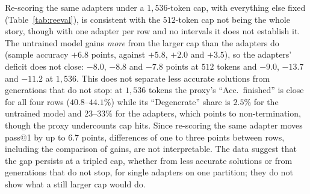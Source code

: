 \documentclass[runningheads]{llncs}
\begin{document}
Re-scoring the same adapters under a $1{,}536$-token cap, with everything else
fixed (Table~\ref{tab:reeval}), is consistent with the $512$-token cap not being
the whole story, though with one adapter per row and no intervals it does not
establish it. The untrained model gains \emph{more} from the larger cap than the adapters
do (sample accuracy $+6.8$ points, against $+5.8$, $+2.0$ and $+3.5$), so the
adapters' deficit does not close: $-8.0$, $-8.8$ and $-7.8$ points at $512$ tokens
and $-9.0$, $-13.7$ and $-11.2$ at $1{,}536$. This does not separate less
accurate solutions from generations that do not stop: at $1{,}536$ tokens the
proxy's ``Acc.\ finished'' is close for all four rows ($40.8$--$44.1\%$) while its
``Degenerate'' share is $2.5\%$ for the untrained model and $23$--$33\%$ for the
adapters, which points to non-termination, though the proxy undercounts cap
hits. Since re-scoring the same adapter moves pass@1 by up to $6.7$ points,
differences of one to three points between rows, including the comparison of
gains, are not interpretable. The data suggest that the gap persists at a
tripled cap, whether from less accurate solutions or from generations that do
not stop, for single adapters on one partition; they do not show what a still
larger cap would do.
\end{document}
